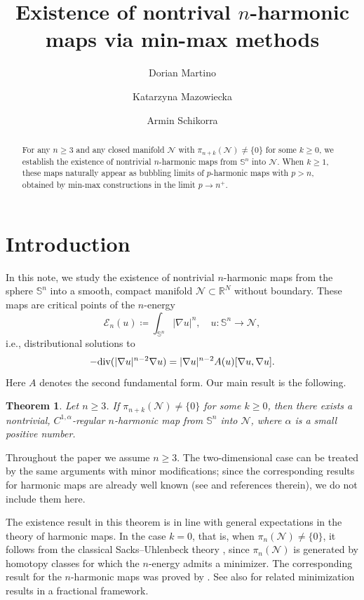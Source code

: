 \documentclass[12pt]{amsart}
\title{Existence of nontrival $n$-harmonic maps via min-max methods}
\author{Dorian Martino}
\author{Katarzyna Mazowiecka}
\author{Armin Schikorra}
\def\n{{\mathcal M}}
\def\n{{\mathcal{M}}}
\def\n{{\mathcal N}}
\def\S{{\mathbb S}}
\renewcommand{\div}{{\rm div}}
\newtheorem{theorem}{Theorem}
\newcommand{\R}{\mathbb{R}}
\numberwithin{theorem}{section} \numberwithin{equation}{section}
\begin{document}
\begin{abstract}
For any $n \geq 3$ and any closed manifold $\n$ with $\pi_{n+k}(\n) \neq \{0\}$ for some $k \geq 0$, we establish the existence of nontrivial $n$-harmonic maps from $\S^n$ into $\n$. When $k\geq 1$, these maps naturally appear as bubbling limits of $p$-harmonic maps with $p > n$, obtained by min-max constructions in the limit $p \to n^+$.
\end{abstract}

\sloppy

\maketitle
\sloppy

\section{Introduction}
In this note, we study the existence of nontrivial $n$-harmonic maps from the sphere $\S^n$ into a smooth, compact manifold $\n \subset \R^N$ without boundary. These maps are critical points of the $n$-energy
\[
 \mathcal{E}_n(u) \coloneqq \int_{\S^n} |\nabla u|^n,\quad u\colon \S^n \to \n,
\]
i.e., distributional solutions to
\begin{equation}
 -\div(|\nabla u|^{n-2} \nabla u) = |\nabla u|^{n-2} A(u)[\nabla u,\nabla u].
\end{equation}
Here $A$ denotes the second fundamental form. Our main result is the following.
\begin{theorem}\label{th:main}
Let $n \geq 3$. If $\pi_{n+k}(\n) \neq \{0\}$ for some $k \geq 0$, then there exists a nontrivial, $C^{1,\alpha}$-regular $n$-harmonic map from $\S^n$ into $\n$, where $\alpha$ is a small positive number.
\end{theorem}
Throughout the paper we assume $n\ge3$. The two-dimensional case can be treated by the same arguments with minor modifications; since the corresponding results for harmonic maps are already well known (see \cite{Lamm06} and references therein), we do not include them here.

The existence result in this theorem is in line with general expectations in the theory of harmonic maps. In the case $k=0$, that is, when $\pi_{n}(\n) \neq \{0\}$, it follows from the classical Sacks--Uhlenbeck theory \cite{SacksU81}, since $\pi_{n}(\n)$ is generated by homotopy classes for which the $n$-energy admits a minimizer. The corresponding result for the $n$-harmonic maps was proved by \cite{Nakauchi-Takakuwa,Kawai-Nakauchi-Takeuchi}. See also \cite{Mazowiecka-Schikorra23} for related minimization results in a fractional framework.
\end{document}
